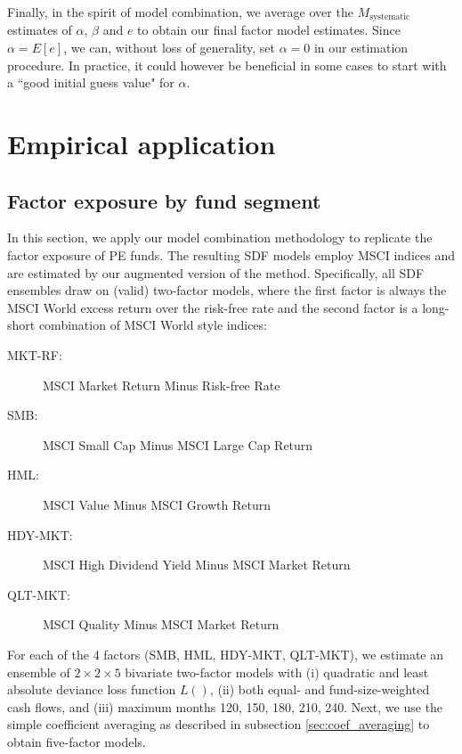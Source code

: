 \documentclass[12pt]{article}
\begin{document}
Finally, in the spirit of model combination, we average over the $M_{\mathrm{systematic}}$ estimates of $\alpha$, $\beta$ and $e$ to obtain our final factor model estimates.
Since $\alpha=E[e]$, we can, without loss of generality, set $\alpha=0$ in our estimation procedure.
In practice, it could however be beneficial in some cases to start with a ``good initial guess value" for $\alpha$.

\section{Empirical application}
\label{sec:applications}

\subsection{Factor exposure by fund segment}
\label{sec:factor_exposure}

In this section, we apply our model combination methodology to replicate the factor exposure of PE funds.
The resulting SDF models employ MSCI indices and are estimated by our augmented version of the \cite{DLP12} method.
Specifically, all SDF ensembles draw on (valid) two-factor models, where the first factor is always the MSCI World excess return over the risk-free rate and the second factor is a long-short combination of MSCI World style indices:
\begin{description}
	\item[MKT-RF:]{MSCI Market Return Minus Risk-free Rate}
	\item[SMB:]{MSCI Small Cap Minus MSCI Large Cap Return}
	\item[HML:]{MSCI Value Minus MSCI Growth Return}
	\item[HDY-MKT:]{MSCI High Dividend Yield Minus MSCI Market Return}
	\item[QLT-MKT:]{MSCI Quality Minus MSCI Market Return}
\end{description}
For each of the 4 factors (SMB, HML, HDY-MKT, QLT-MKT), we estimate an ensemble of $2 \times 2 \times 5$ bivariate two-factor models with (i) quadratic and least absolute deviance loss function $L()$, (ii) both equal- and fund-size-weighted cash flows, and (iii) maximum months 120, 150, 180, 210, 240.
Next, we use the simple coefficient averaging as described in subsection \ref{sec:coef_averaging} to obtain five-factor models.
\end{document}
